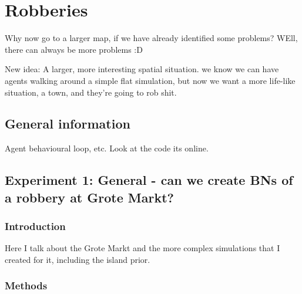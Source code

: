  

\chapter[Robberies in real locations]{Robberies}


Why now go to a larger map, if we have already identified some problems? WEll, there can always be more problems :D 


New idea: A  larger, more interesting spatial situation. we know we can have agents walking around a simple flat simulation, but now we want a more life-like situation, a town, and they're going to rob shit.


\section{General information}


Agent behavioural loop, etc. Look at the code its online.




\section{Experiment 1: General - can we create BNs of a robbery at Grote Markt?}
\subsection{Introduction}
Here I talk about the Grote Markt and the more complex simulations that I created for it, including the island prior.

\subsection{Methods}

